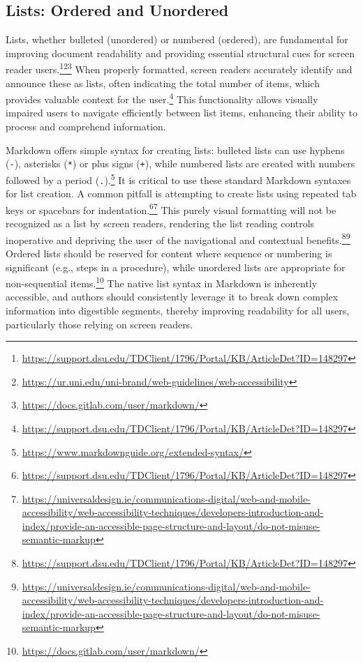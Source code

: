 \subsection{Lists: Ordered and Unordered}
Lists, whether bulleted (unordered) or numbered (ordered), are fundamental for improving document readability and providing essential structural cues for screen reader users.\footnote{\url{https://support.dsu.edu/TDClient/1796/Portal/KB/ArticleDet?ID=148297}}\footnote{\url{https://ur.uni.edu/uni-brand/web-guidelines/web-accessibility}}\footnote{\url{https://docs.gitlab.com/user/markdown/}} When properly formatted, screen readers accurately identify and announce these as lists, often indicating the total number of items, which provides valuable context for the user.\footnote{\url{https://support.dsu.edu/TDClient/1796/Portal/KB/ArticleDet?ID=148297}} This functionality allows visually impaired users to navigate efficiently between list items, enhancing their ability to process and comprehend information.

Markdown offers simple syntax for creating lists: bulleted lists can use hyphens (\texttt{-}), asterisks (\texttt{*}) or plus signs (\texttt{+}), while numbered lists are created with numbers followed by a period (\texttt{.}).\footnote{\url{https://www.markdownguide.org/extended-syntax/}} It is critical to use these standard Markdown syntaxes for list creation. A common pitfall is attempting to create lists using repeated tab keys or spacebars for indentation.\footnote{\url{https://support.dsu.edu/TDClient/1796/Portal/KB/ArticleDet?ID=148297}}\footnote{\url{https://universaldesign.ie/communications-digital/web-and-mobile-accessibility/web-accessibility-techniques/developers-introduction-and-index/provide-an-accessible-page-structure-and-layout/do-not-misuse-semantic-markup}} This purely visual formatting will not be recognized as a list by screen readers, rendering the list reading controls inoperative and depriving the user of the navigational and contextual benefits.\footnote{\url{https://support.dsu.edu/TDClient/1796/Portal/KB/ArticleDet?ID=148297}}\footnote{\url{https://universaldesign.ie/communications-digital/web-and-mobile-accessibility/web-accessibility-techniques/developers-introduction-and-index/provide-an-accessible-page-structure-and-layout/do-not-misuse-semantic-markup}} Ordered lists should be reserved for content where sequence or numbering is significant (e.g., steps in a procedure), while unordered lists are appropriate for non-sequential items.\footnote{\url{https://docs.gitlab.com/user/markdown/}} The native list syntax in Markdown is inherently accessible, and authors should consistently leverage it to break down complex information into digestible segments, thereby improving readability for all users, particularly those relying on screen readers.


